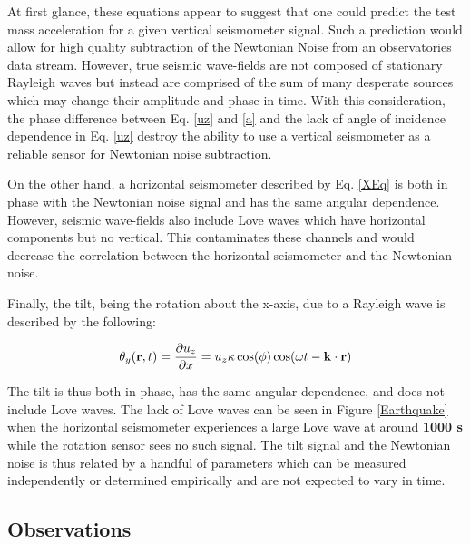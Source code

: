 \documentclass [12pt, proquest]{uwthesis}[2019]
\begin{document}
At first glance, these equations appear to suggest that one could predict the test mass acceleration for a given vertical seismometer signal. Such a prediction would allow for high quality subtraction of the Newtonian Noise from an observatories data stream. However, true seismic wave-fields are not composed of stationary Rayleigh waves but instead are comprised of the sum of many desperate sources which may change their amplitude and phase in time. With this consideration, the phase difference between Eq. \ref{uz} and \ref{a} and the lack of angle of incidence dependence in Eq. \ref{uz} destroy the ability to use a vertical seismometer as a reliable sensor for Newtonian noise subtraction.

On the other hand, a horizontal seismometer described by Eq. \ref{XEq} is both in phase with the Newtonian noise signal and has the same angular dependence. However, seismic wave-fields also include Love waves which have horizontal components but no vertical. This contaminates these channels and would decrease the correlation between the horizontal seismometer and the Newtonian noise. 

Finally, the tilt, being the rotation about the x-axis, due to a Rayleigh wave is described by the following:

\begin{equation}
\theta_y({\bf r} ,t)=\frac{\partial u_z}{\partial x}=u_z \kappa \cos(\phi) \cos(\omega t-{\bf k}\cdot{\bf r})\label{tX}\\
\end{equation}

The tilt is thus both in phase, has the same angular dependence, and does not include Love waves. The lack of Love waves can be seen in Figure \ref{Earthquake} when the horizontal seismometer experiences a large Love wave at around \textbf{1000 s} while the rotation sensor sees no such signal. The tilt signal and the Newtonian noise is thus related by a handful of parameters which can be measured independently or determined empirically and are not expected to vary in time.

\subsection{Observations}



\printendnotes
\nocite{*}   


\end{document}
